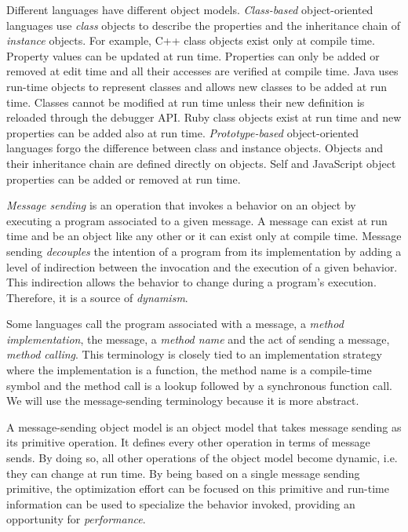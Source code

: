 Different languages have different object models. \textit{Class-based}
object-oriented languages use \textit{class} objects to describe the properties
and the inheritance chain of \textit{instance} objects. For example, C++ class
objects exist only at compile time. Property values can be updated at run time.
Properties can only be added or removed at edit time and all their accesses are
verified at compile time. Java uses run-time objects to represent classes and
allows new classes to be added at run time.  Classes cannot be modified at run
time unless their new definition is reloaded through the debugger API. Ruby
class objects exist at run time and new properties can be added also at run
time. \textit{Prototype-based} object-oriented languages forgo the difference
between class and instance objects. Objects and their inheritance chain are
defined directly on objects. Self and JavaScript object properties can be
added or removed at run time. 

\textit{Message sending} is an operation that invokes a behavior on an object by
executing a program associated to a given message.  A message can exist at run
time and be an object like any other or it can exist only at compile time.
Message sending \textit{decouples} the intention of a program from its
implementation by adding a level of indirection between the invocation and the
execution of a given behavior. This indirection allows the behavior to change
during a program's execution. Therefore, it is a source of \textit{dynamism}.

Some languages call the program associated with a message, a \textit{method
implementation}, the message, a \textit{method name} and the act of sending a
message, \textit{method calling}. This terminology is closely tied to an
implementation strategy where the implementation is a function, the method name
is a compile-time symbol and the method call is a lookup followed by a
synchronous function call. We will use the message-sending terminology because
it is more abstract. 

A message-sending object model is an object model that takes message sending as
its primitive operation. It defines every other operation in terms of message
sends. By doing so, all other operations of the object model become dynamic,
i.e. they can change at run time. By being based on a single message sending
primitive, the optimization effort can be focused on this primitive and
run-time information can be used to specialize the behavior invoked, providing
an opportunity for \textit{performance}. 

